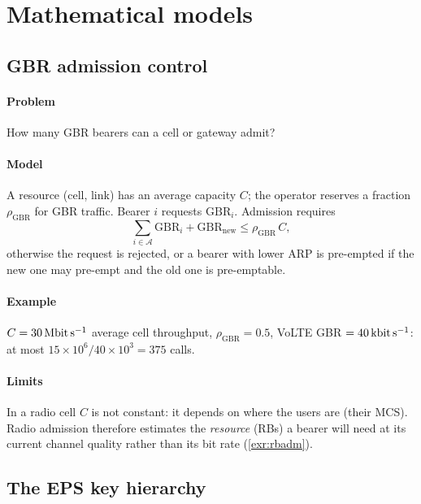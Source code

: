 \documentclass[11pt,a4paper]{article}
\begin{document}
\section{Mathematical models}

\subsection{GBR admission control}\label{sec:admission}
\paragraph{Problem} How many GBR bearers can a cell or gateway admit?
\paragraph{Model} A resource (cell, link) has an average capacity $C$; the operator reserves a
fraction $\rho_{\mathrm{GBR}}$ for GBR traffic. Bearer $i$ requests $\mathrm{GBR}_i$. Admission
requires
\begin{equation}\label{eq:adm}
  \sum_{i\in\mathcal{A}}\mathrm{GBR}_i + \mathrm{GBR}_{\mathrm{new}} \le \rho_{\mathrm{GBR}}\,C ,
\end{equation}
otherwise the request is rejected, or a bearer with lower ARP is pre-empted if the new one may
pre-empt and the old one is pre-emptable.
\paragraph{Example} $C = \qty{30}{\mega\bit\per\second}$ average cell throughput, $\rho_{\mathrm{GBR}} = 0.5$,
VoLTE GBR $= \qty{40}{\kilo\bit\per\second}$: at most $15\times10^6/40\times10^3 = 375$ calls.
\paragraph{Limits} In a radio cell $C$ is not constant: it depends on where the users are (their MCS).
Radio admission therefore estimates the \emph{resource} (RBs) a bearer will need at its current
channel quality rather than its bit rate (\cref{exr:rbadm}).

\subsection{The EPS key hierarchy}\label{sec:keys}
\end{document}
